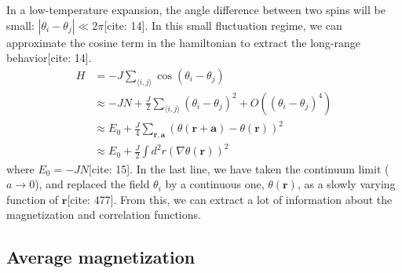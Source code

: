 \documentclass[11pt]{article}
\begin{document}
In a low-temperature expansion, the angle difference between two spins will be small: $|\theta_i - \theta_j| \ll 2\pi$[cite: 14]. In this small fluctuation regime, we can approximate the cosine term in the hamiltonian to extract the long-range behavior[cite: 14].
\begin{align}
H &= -J \sum_{\langle i,j \rangle} \cos(\theta_i - \theta_j) \nonumber \\
  &\approx -JN + \frac{J}{2} \sum_{\langle i,j \rangle} (\theta_i - \theta_j)^2 + O((\theta_i - \theta_j)^4) \nonumber \\
  &\approx E_0 + \frac{J}{4} \sum_{\mathbf{r}, \mathbf{a}} (\theta(\mathbf{r}+\mathbf{a}) - \theta(\mathbf{r}))^2 \nonumber \\
  &\approx E_0 + \frac{J}{2} \int d^2r (\nabla \theta(\mathbf{r}))^2 \label{eq:H_lowT}
\end{align}
where $E_0 = -JN$[cite: 15]. In the last line, we have taken the continuum limit ($a \to 0$), and replaced the field $\theta_i$ by a continuous one, $\theta(\mathbf{r})$, as a slowly varying function of $\mathbf{r}$[cite: 477]. From this, we can extract a lot of information about the magnetization and correlation functions.

\subsection{Average magnetization}
\end{document}
